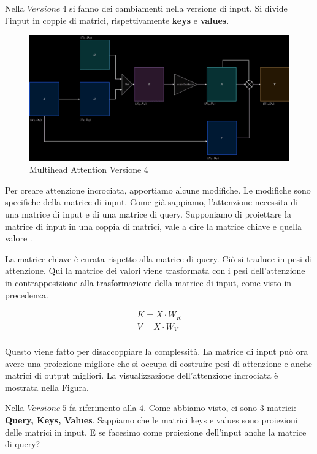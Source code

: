 Nella $Versione \ 4$ si fanno dei cambiamenti nella versione di input. Si
divide l'input in coppie di matrici, rispettivamente \textbf{keys} e
\textbf{values}.
\begin{figure}[H]
    \includegraphics[width=\textwidth]{images/evolution-Version-4.png}
    \caption{Multihead Attention Versione 4}
\end{figure}

Per creare attenzione incrociata, apportiamo alcune modifiche. Le modifiche
sono specifiche della matrice di input. Come già sappiamo, l'attenzione
necessita di una matrice di input e di una matrice di query. Supponiamo di
proiettare la matrice di input in una coppia di matrici, vale a dire la matrice
chiave e quella valore .

La matrice chiave è curata rispetto alla matrice di query. Ciò si traduce in
pesi di attenzione. Qui la matrice dei valori viene trasformata con i pesi
dell'attenzione in contrapposizione alla trasformazione della matrice di input,
come visto in precedenza.

\begin{equation}
    \begin{aligned}
        K = X \cdot W_K \\
        V = X \cdot W_V \\
    \end{aligned}
\end{equation}

Questo viene fatto per disaccoppiare la complessità. La matrice di input può
ora avere una proiezione migliore che si occupa di costruire pesi di attenzione
e anche matrici di output migliori. La visualizzazione dell'attenzione
incrociata è mostrata nella Figura.

Nella $Versione \ 5$ fa riferimento alla $4$. Come abbiamo visto, ci sono 3
matrici: \textbf{Query, Keys, Values}. Sappiamo che le matrici keys e values
sono proiezioni delle matrici in input. E se facesimo come proiezione
dell'input anche la matrice di query?

